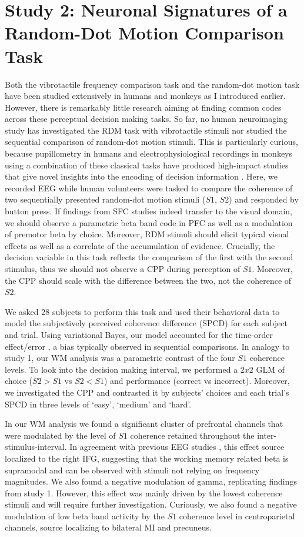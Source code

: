 \section{Study 2: Neuronal Signatures of a Random-Dot Motion Comparison Task}
Both the vibrotactile frequency comparison task and the random-dot motion task have been studied extensively in humans and monkeys as I introduced earlier. However, there is remarkably little research aiming at finding common codes across these perceptual decision making tasks. So far, no human neuroimaging study has investigated the RDM task with vibrotactile stimuli nor studied the sequential comparison of random-dot motion stimuli. This is particularly curious, because pupillometry in humans and electrophysiological recordings in monkeys using a combination of these classical tasks have produced high-impact studies that give novel insights into the encoding of decision information \parencite{Urai2017,Wimmer2016}. Here, we recorded EEG while human volunteers were tasked to compare the coherence of two sequentially presented random-dot motion stimuli ($S1$, $S2$) and responded by button press. If findings from SFC studies indeed transfer to the visual domain, we should observe a parametric beta band code in PFC as well as a modulation of premotor beta by choice. Moreover, RDM stimuli should elicit typical visual effects as well as a correlate of the accumulation of evidence. Crucially, the decision variable in this task reflects the comparison of the first with the second stimulus, thus we should not observe a CPP during perception of $S1$. Moreover, the CPP should scale with the difference between the two, not the coherence of $S2$.

We asked 28 subjects to perform this task and used their behavioral data to model the subjectively perceived coherence difference (SPCD) for each subject and trial. Using variational Bayes, our model accounted for the time-order effect/error \parencite{Hellstrom1985}, a bias typically observed in sequential comparisons. In analogy to study 1, our WM analysis was a parametric contrast of the four $S1$ coherence levels. To look into the decision making interval, we performed a $2x2$ GLM of choice ($S2>S1$ vs $S2<S1$) and performance (correct vs incorrect). Moreover, we investigated the CPP and contrasted it by subjects’ choices and each trial’s SPCD in three levels of ‘easy’, ‘medium’ and ‘hard’.

In our WM analysis we found a significant cluster of prefrontal channels that were modulated by the level of $S1$ coherence retained throughout the inter-stimulus-interval. In agreement with previous EEG studies \parencite{Spitzer2010,Spitzer2012}, this effect source localized to the right IFG, suggesting that the working memory related beta is supramodal and can be observed with stimuli not relying on frequency magnitudes. We also found a negative modulation of gamma, replicating findings from study 1. However, this effect was mainly driven by the lowest coherence stimuli and will require further investigation. Curiously, we also found a negative modulation of low beta band activity by the $S1$ coherence level in centroparietal channels, source localizing to bilateral MI and precuneus.

